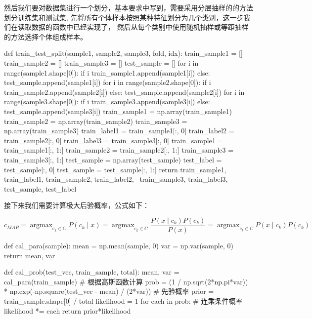 \documentclass[UTF8,a4paper,10pt]{ctexart}
\begin{document}
然后我们要对数据集进行一个划分，基本要求中写到，需要采用分层抽样的的方法划分训练集和测试集,
先将所有个体样本按照某种特征划分为几个类别，这一步我们在读取数据的函数中已经实现了，
然后从每个类别中使用随机抽样或等距抽样的方法选择个体组成样本。

\begin{python}
   def train_test_split(sample1, sample2, sample3, fold, idx):
    train_sample1 = []
    train_sample2 = []
    train_sample3 = []
    test_sample = []
    for i in range(sample1.shape[0]):
        if i %
            train_sample1.append(sample1[i])
        else:
            test_sample.append(sample1[i])
    for i in range(sample2.shape[0]):
        if i %
            train_sample2.append(sample2[i])
        else:
            test_sample.append(sample2[i])
    for i in range(sample3.shape[0]):
        if i %
            train_sample3.append(sample3[i])
        else:
            test_sample.append(sample3[i])
    train_sample1 = np.array(train_sample1)
    train_sample2 = np.array(train_sample2)
    train_sample3 = np.array(train_sample3)
    train_label1 = train_sample1[:, 0]
    train_label2 = train_sample2[:, 0]
    train_label3 = train_sample3[:, 0]
    train_sample1 = train_sample1[:, 1:]
    train_sample2 = train_sample2[:, 1:]
    train_sample3 = train_sample3[:, 1:]
    test_sample = np.array(test_sample)
    test_label = test_sample[:, 0]
    test_sample = test_sample[:, 1:]
    return train_sample1, train_label1, train_sample2, train_label2, \
           train_sample3, train_label3, test_sample, test_label
\end{python}

接下来我们需要计算极大后验概率，公式如下：

\begin{equation}
    c_{M A P}=\operatorname{argmax}_{\mathrm{c}_{k} \in C} P\left(c_{k} \mid x\right)=\operatorname{argmax}_{c_{k} \in C} \frac{P\left(x \mid c_{k}\right) P\left(c_{k}\right)}{P(x)}=\operatorname{argmax}_{c_{k} \in C} P\left(x \mid c_{k}\right) P\left(c_{k}\right)
\end{equation}

\begin{python}
   def cal_para(sample):
    mean = np.mean(sample, 0)
    var = np.var(sample, 0)
    return mean, var


def cal_prob(test_vec, train_sample, total):
    mean, var = cal_para(train_sample)
    # 根据高斯函数计算
    prob = (1 / np.sqrt(2*np.pi*var)) * np.exp(-np.square(test_vec - mean) / (2*var))
    # 先验概率
    prior = train_sample.shape[0] / total
    likelihood = 1
    for each in prob:
        # 连乘条件概率
        likelihood *= each
    return prior*likelihood
\end{python}
\end{document}
